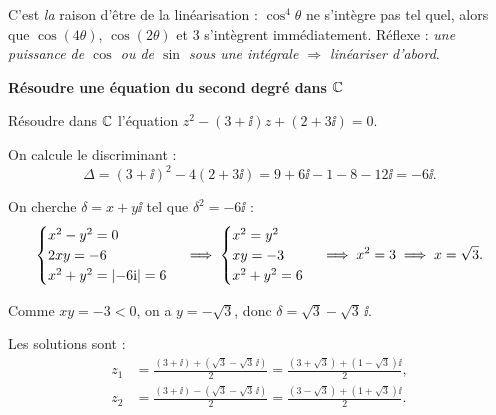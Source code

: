 \begin{astucebac}
	C'est \emph{la} raison d'être de la linéarisation : $\cos^4\theta$ ne
	s'intègre pas tel quel, alors que $\cos(4\theta)$, $\cos(2\theta)$ et $3$
	s'intègrent immédiatement. Réflexe : \emph{une puissance de $\cos$ ou de
	$\sin$ sous une intégrale $\Rightarrow$ linéariser d'abord}.
\end{astucebac}



\exerciceresolu
\textbf{Résoudre une équation du second degré dans $\mathbb{C}$}

Résoudre dans $\mathbb{C}$ l'équation $z^2 - (3 + \ii)z + (2 + 3\ii) = 0$.

\solution

On calcule le discriminant :
$$
\Delta = (3+\ii)^2 - 4(2+3\ii) = 9 + 6\ii - 1 - 8 - 12\ii = -6\ii.
$$

On cherche $\delta = x + y\ii$ tel que $\delta^2 = -6\ii$ :
$$
\begin{cases}
	x^2 - y^2 = 0 \\
	2xy = -6 \\
	x^2 + y^2 = \left|-6\mathrm{i}\right| = 6
\end{cases}
\implies
\begin{cases}
	x^2 = y^2 \\
	xy = -3 \\
	x^2 + y^2 = 6
\end{cases}
\implies x^2 = 3 \implies x = \sqrt{3}.
$$

Comme $xy = -3 < 0$, on a $y = -\sqrt{3}$, donc $\delta = \sqrt{3} - \sqrt{3}\,\ii$.

Les solutions sont :
$$
\begin{aligned}
	z_1 &= \frac{(3+\ii) + (\sqrt{3} - \sqrt{3}\,\ii)}{2}
	     = \frac{(3+\sqrt{3}) + (1-\sqrt{3})\ii}{2},\\
	z_2 &= \frac{(3+\ii) - (\sqrt{3} - \sqrt{3}\,\ii)}{2}
	     = \frac{(3-\sqrt{3}) + (1+\sqrt{3})\ii}{2}.
\end{aligned}
$$



%
%
%
%
%

